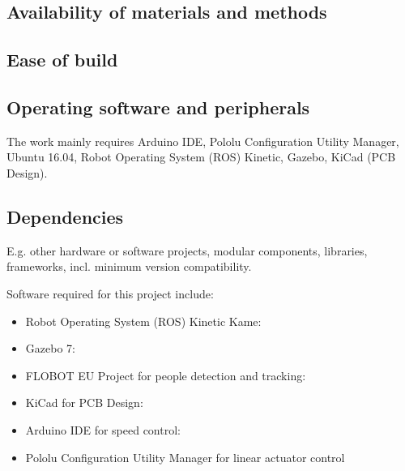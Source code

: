 \documentclass[a4paper]{article}
\begin{document}
\subsection{Availability of materials and methods}\label{h.60suejv0jlzi}



\subsection{Ease of build}\label{h.wg823sgyb1e4}



\subsection{Operating software and peripherals}\label{h.uz77dixfh5i4}



The work mainly requires Arduino IDE, Pololu Configuration Utility Manager, Ubuntu 16.04, Robot Operating System (ROS) Kinetic, Gazebo, KiCad (PCB Design). 


\subsection{Dependencies}\label{h.vr0vnjs8z9ar}

E.g. other hardware or software projects, modular components,
libraries, frameworks, incl. minimum version compatibility.

Software required for this project include:
\begin{itemize}
	\item Robot Operating System (ROS) Kinetic Kame: 
	\item Gazebo 7: 
	\item FLOBOT EU Project for people detection and tracking:
	\item KiCad for PCB Design:
	\item Arduino IDE for speed control: 
	\item Pololu Configuration Utility Manager for linear actuator control
\end{itemize}
\end{document}
